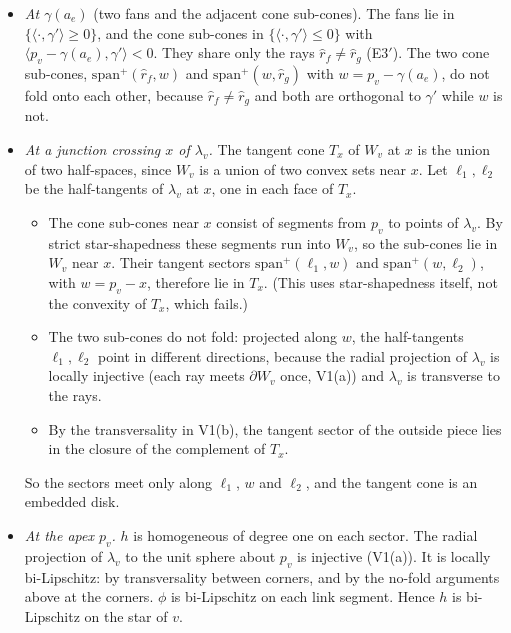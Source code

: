 \begin{itemize}
  only the rays $k'$ (fan and $Q_f$), $-\hat r$ (fan and cone), $w$ (between the two cone sub-sectors) and $-k'$ (cone
  and $Q_f$). The two cone sub-sectors do not fold: if $-\hat r$, $w$, $-k'$ were coplanar, then $w\in\inter Q$ would
  force $w=-a\hat r-bk'$ with $a,b>0$, strictly between them. Hence the tangent cone is an embedded disk.
\item \emph{At $\gamma(a_e)$} (two fans and the adjacent cone sub-cones). The fans lie in
$\{\langle\cdot,\gamma'\rangle\ge0\}$, and the cone sub-cones in $\{\langle\cdot,\gamma'\rangle\le0\}$ with
$\langle p_v-\gamma(a_e),\gamma'\rangle<0$. They share only the rays $\hat r_f\ne\hat r_g$ (E3$'$). The two cone
sub-cones, $\mathrm{span}^+(\hat r_f,w)$ and $\mathrm{span}^+(w,\hat r_g)$ with $w=p_v-\gamma(a_e)$, do not fold onto each
other, because $\hat r_f\ne\hat r_g$ and both are orthogonal to $\gamma'$ while $w$ is not.
\item \emph{At a junction crossing $x$ of $\lambda_v$.} The tangent cone $T_x$ of $W_v$ at $x$ is the union of two
half-spaces, since $W_v$ is a union of two convex sets near $x$. Let $\ell_1,\ell_2$ be the half-tangents of $\lambda_v$
at $x$, one in each face of $T_x$.
  \begin{itemize}
  \item The cone sub-cones near $x$ consist of segments from $p_v$ to points of $\lambda_v$. By strict star-shapedness
  these segments run into $W_v$, so the sub-cones lie in $W_v$ near $x$. Their tangent sectors
  $\mathrm{span}^+(\ell_1,w)$ and $\mathrm{span}^+(w,\ell_2)$, with $w=p_v-x$, therefore lie in $T_x$. (This uses
  star-shapedness itself, not the convexity of $T_x$, which fails.)
  \item The two sub-cones do not fold: projected along $w$, the half-tangents $\ell_1,\ell_2$ point in different
  directions, because the radial projection of $\lambda_v$ is locally injective (each ray meets $\partial W_v$ once,
  V1(a)) and $\lambda_v$ is transverse to the rays.
  \item By the transversality in V1(b), the tangent sector of the outside piece lies in the closure of the complement
  of $T_x$.
  \end{itemize}
  So the sectors meet only along $\ell_1$, $w$ and $\ell_2$, and the tangent cone is an embedded disk.
\item \emph{At the apex $p_v$.} $h$ is homogeneous of degree one on each sector. The radial projection of $\lambda_v$
to the unit sphere about $p_v$ is injective (V1(a)). It is locally bi-Lipschitz: by transversality between corners,
and by the no-fold arguments above at the corners. $\phi$ is bi-Lipschitz on each link segment. Hence $h$ is
bi-Lipschitz on the star of $v$.
\end{itemize}

